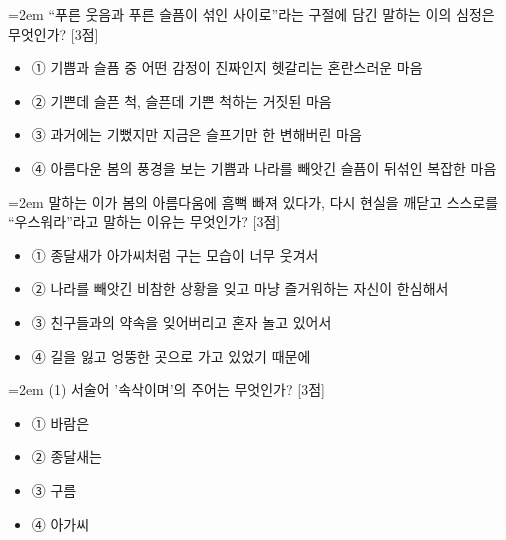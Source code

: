 \documentclass[10pt,a4paper]{article}
\newcommand{\qnum}[1]{%
  \tikz[baseline=(num.base)]{%
    \node[circle, fill=numCircle, text=white, inner sep=0pt,
          minimum size=18pt, font=\small\bfseries] (num) {#1};%
  }%
}
\newcommand{\pts}[1]{%
  \hfill\textcolor{ptsBadge}{[#1점]}%
}
\begin{document}
\vspace{4mm}
\begin{minipage}{\columnwidth}
{\hangindent=2em
\qnum{20}\enspace “푸른 웃음과 푸른 슬픔이 섞인 사이로”라는 구절에 담긴 말하는 이의 심정은 무엇인가? \pts{3}
\par}

\vspace{3mm}
\begin{itemize}[leftmargin=2.5em, labelsep=0.3em, label={}, itemsep=4pt, parsep=1pt, topsep=0pt]
  \item ① 기쁨과 슬픔 중 어떤 감정이 진짜인지 헷갈리는 혼란스러운 마음
  \item ② 기쁜데 슬픈 척, 슬픈데 기쁜 척하는 거짓된 마음
  \item ③ 과거에는 기뻤지만 지금은 슬프기만 한 변해버린 마음
  \item ④ 아름다운 봄의 풍경을 보는 기쁨과 나라를 빼앗긴 슬픔이 뒤섞인 복잡한 마음
\end{itemize}
\end{minipage}
\vspace{4mm}

\vspace{4mm}
\begin{minipage}{\columnwidth}
{\hangindent=2em
\qnum{21}\enspace 말하는 이가 봄의 아름다움에 흠뻑 빠져 있다가, 다시 현실을 깨닫고 스스로를 “우스워라”라고 말하는 이유는 무엇인가? \pts{3}
\par}

\vspace{3mm}
\begin{itemize}[leftmargin=2.5em, labelsep=0.3em, label={}, itemsep=4pt, parsep=1pt, topsep=0pt]
  \item ① 종달새가 아가씨처럼 구는 모습이 너무 웃겨서
  \item ② 나라를 빼앗긴 비참한 상황을 잊고 마냥 즐거워하는 자신이 한심해서
  \item ③ 친구들과의 약속을 잊어버리고 혼자 놀고 있어서
  \item ④ 길을 잃고 엉뚱한 곳으로 가고 있었기 때문에
\end{itemize}
\end{minipage}
\vspace{4mm}

\vspace{4mm}
\begin{minipage}{\columnwidth}
{\hangindent=2em
\qnum{22}\enspace (1) 서술어 '속삭이며'의 주어는 무엇인가? \pts{3}
\par}

\vspace{3mm}
\begin{itemize}[leftmargin=2.5em, labelsep=0.3em, label={}, itemsep=4pt, parsep=1pt, topsep=0pt]
  \item ① 바람은
  \item ② 종달새는
  \item ③ 구름
  \item ④ 아가씨
\end{itemize}
\end{minipage}
\vspace{4mm}
\end{document}
